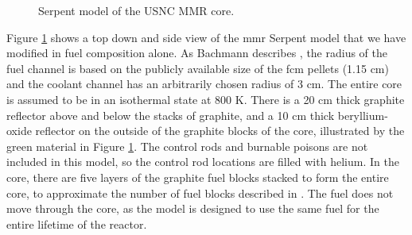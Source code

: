 \begin{figure}[H]
    \hfill
    \caption{Serpent model of the USNC MMR core.}
    \label{fig:mmr_core}
\end{figure}

Figure \ref{fig:mmr_core} shows a top down and side view of the \gls{mmr} Serpent model \cite{bachmann_mmr_like_2023} that we have modified in fuel composition alone. As Bachmann describes \cite{bachmann_thesis_2023}, the radius of the fuel channel is based on the publicly available size of the \gls{fcm} pellets (1.15 cm) and the coolant channel has an arbitrarily chosen radius of 3 cm. The entire core is assumed to be in an isothermal state at 800 K. There is a 20 cm thick graphite reflector above and below the stacks of graphite, and a 10 cm thick beryllium-oxide reflector on the outside of the graphite blocks of the core, illustrated by the green material in Figure \ref{fig:mmr_core}. The control rods and burnable poisons are not included in this model, so the control rod locations are filled with helium. In the core, there are five layers of the graphite fuel blocks stacked to form the entire core, to approximate the number of fuel blocks described in \cite{usnc_design_2021}. The fuel does not move through the core, as the model is designed to use the same fuel for the entire lifetime of the reactor.



